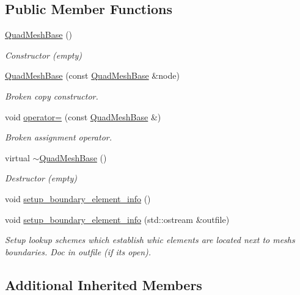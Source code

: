 \subsection*{Public Member Functions}
\begin{DoxyCompactItemize}
\item 
\hyperlink{classoomph_1_1QuadMeshBase_a56c68363a134866e636f8aa4a8a29de9}{Quad\+Mesh\+Base} ()
\begin{DoxyCompactList}\small\item\em Constructor (empty) \end{DoxyCompactList}\item 
\hyperlink{classoomph_1_1QuadMeshBase_a4b12180211307b053d398eff9c7afcb0}{Quad\+Mesh\+Base} (const \hyperlink{classoomph_1_1QuadMeshBase}{Quad\+Mesh\+Base} \&node)
\begin{DoxyCompactList}\small\item\em Broken copy constructor. \end{DoxyCompactList}\item 
void \hyperlink{classoomph_1_1QuadMeshBase_ac8e97a828c6d6ccb2dd2e9acbf2f3571}{operator=} (const \hyperlink{classoomph_1_1QuadMeshBase}{Quad\+Mesh\+Base} \&)
\begin{DoxyCompactList}\small\item\em Broken assignment operator. \end{DoxyCompactList}\item 
virtual \hyperlink{classoomph_1_1QuadMeshBase_abffed544c2e94b255a5a69e66c13b4a0}{$\sim$\+Quad\+Mesh\+Base} ()
\begin{DoxyCompactList}\small\item\em Destructor (empty) \end{DoxyCompactList}\item 
void \hyperlink{classoomph_1_1QuadMeshBase_ad1e5291285fbf34c62cbd45156dded2d}{setup\+\_\+boundary\+\_\+element\+\_\+info} ()
\item 
void \hyperlink{classoomph_1_1QuadMeshBase_ac61bda5612c87848bb640c8e24371a54}{setup\+\_\+boundary\+\_\+element\+\_\+info} (std\+::ostream \&outfile)
\begin{DoxyCompactList}\small\item\em Setup lookup schemes which establish whic elements are located next to mesh\textquotesingle{}s boundaries. Doc in outfile (if it\textquotesingle{}s open). \end{DoxyCompactList}\end{DoxyCompactItemize}
\subsection*{Additional Inherited Members}


